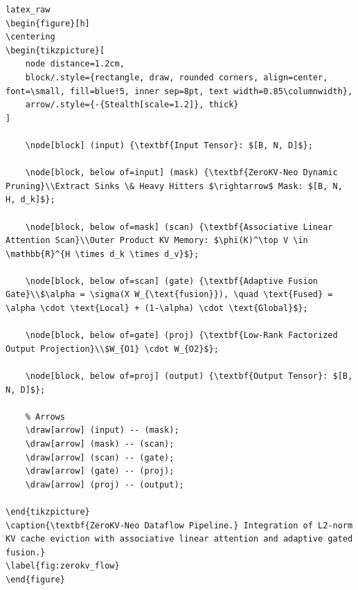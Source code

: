 \vspace{0.5em}
\begin{mdframed}[backgroundcolor=codebg, linecolor=codeframe, linewidth=1pt, roundcorner=4pt, innerleftmargin=2pt, innerrightmargin=5pt, innertopmargin=5pt, innerbottommargin=5pt]
\begin{lstlisting}
latex_raw
\begin{figure}[h]
\centering
\begin{tikzpicture}[
    node distance=1.2cm,
    block/.style={rectangle, draw, rounded corners, align=center, font=\small, fill=blue!5, inner sep=8pt, text width=0.85\columnwidth},
    arrow/.style={-{Stealth[scale=1.2]}, thick}
]

    \node[block] (input) {\textbf{Input Tensor}: $[B, N, D]$};
    
    \node[block, below of=input] (mask) {\textbf{ZeroKV-Neo Dynamic Pruning}\\Extract Sinks \& Heavy Hitters $\rightarrow$ Mask: $[B, N, H, d_k]$};
    
    \node[block, below of=mask] (scan) {\textbf{Associative Linear Attention Scan}\\Outer Product KV Memory: $\phi(K)^\top V \in \mathbb{R}^{H \times d_k \times d_v}$};
    
    \node[block, below of=scan] (gate) {\textbf{Adaptive Fusion Gate}\\$\alpha = \sigma(X W_{\text{fusion}}), \quad \text{Fused} = \alpha \cdot \text{Local} + (1-\alpha) \cdot \text{Global}$};
    
    \node[block, below of=gate] (proj) {\textbf{Low-Rank Factorized Output Projection}\\$W_{O1} \cdot W_{O2}$};
    
    \node[block, below of=proj] (output) {\textbf{Output Tensor}: $[B, N, D]$};

    % Arrows
    \draw[arrow] (input) -- (mask);
    \draw[arrow] (mask) -- (scan);
    \draw[arrow] (scan) -- (gate);
    \draw[arrow] (gate) -- (proj);
    \draw[arrow] (proj) -- (output);

\end{tikzpicture}
\caption{\textbf{ZeroKV-Neo Dataflow Pipeline.} Integration of L2-norm KV cache eviction with associative linear attention and adaptive gated fusion.}
\label{fig:zerokv_flow}
\end{figure}
\end{lstlisting}
\end{mdframed}
\vspace{0.5em}


